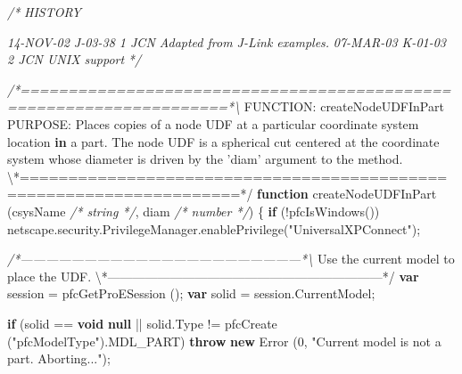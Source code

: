 \documentclass[]{article}
\newenvironment{Shaded}{}{}
\newcommand{\KeywordTok}[1]{\textcolor[rgb]{0.00,0.44,0.13}{\textbf{{#1}}}}
\newcommand{\DecValTok}[1]{\textcolor[rgb]{0.25,0.63,0.44}{{#1}}}
\newcommand{\StringTok}[1]{\textcolor[rgb]{0.25,0.44,0.63}{{#1}}}
\newcommand{\CommentTok}[1]{\textcolor[rgb]{0.38,0.63,0.69}{\textit{{#1}}}}
\newcommand{\OtherTok}[1]{\textcolor[rgb]{0.00,0.44,0.13}{{#1}}}
\newcommand{\FunctionTok}[1]{\textcolor[rgb]{0.02,0.16,0.49}{{#1}}}
\newcommand{\NormalTok}[1]{{#1}}
\begin{document}
\begin{Shaded}
\begin{Highlighting}[]
\CommentTok{/*}
\CommentTok{   HISTORY}

\CommentTok{14-NOV-02   J-03-38   $$1   JCN      Adapted from J-Link examples.}
\CommentTok{07-MAR-03   K-01-03   $$2   JCN      UNIX support}
\CommentTok{ */}

\CommentTok{/*====================================================================*\textbackslash{}}
\NormalTok{FUNCTION: createNodeUDFInPart}
\NormalTok{PURPOSE:  Places copies of a node UDF at a particular coordinate system }
          \NormalTok{location }\KeywordTok{in} \NormalTok{a }\OtherTok{part}\NormalTok{.  }\FunctionTok{The} \FunctionTok{node} \FunctionTok{UDF} \FunctionTok{is} \FunctionTok{a} \FunctionTok{spherical} \FunctionTok{cut} \FunctionTok{centered} \FunctionTok{at} \FunctionTok{the} 
          \NormalTok{coordinate system whose diameter is driven by the }\StringTok{'diam'} \NormalTok{argument to the }
          \OtherTok{method}\NormalTok{.}
\NormalTok{\textbackslash{}*====================================================================*}\OtherTok{/}
\KeywordTok{function} \FunctionTok{createNodeUDFInPart} \NormalTok{(csysName }\CommentTok{/* string */}\NormalTok{, }
                  \NormalTok{diam }\CommentTok{/* number */}\NormalTok{) }
\NormalTok{\{}
  \KeywordTok{if} \NormalTok{(!}\FunctionTok{pfcIsWindows}\NormalTok{())}
    \OtherTok{netscape}\NormalTok{.}\OtherTok{security}\NormalTok{.}\OtherTok{PrivilegeManager}\NormalTok{.}\FunctionTok{enablePrivilege}\NormalTok{(}\StringTok{"UniversalXPConnect"}\NormalTok{);}
  
\CommentTok{/*------------------------------------------------------------------*\textbackslash{}}
  \NormalTok{Use the current model to place the }\OtherTok{UDF}\NormalTok{.}
\NormalTok{\textbackslash{}*------------------------------------------------------------------*}\OtherTok{/}
  \KeywordTok{var} \NormalTok{session = }\FunctionTok{pfcGetProESession} \NormalTok{();}
  \KeywordTok{var} \NormalTok{solid = }\OtherTok{session}\NormalTok{.}\FunctionTok{CurrentModel}\NormalTok{;}
  
  \KeywordTok{if} \NormalTok{(solid == }\KeywordTok{void} \KeywordTok{null} \NormalTok{|| }\OtherTok{solid}\NormalTok{.}\FunctionTok{Type} \NormalTok{!= }\FunctionTok{pfcCreate} \NormalTok{(}\StringTok{"pfcModelType"}\NormalTok{).}\FunctionTok{MDL_PART}\NormalTok{)}
    \KeywordTok{throw} \KeywordTok{new} \FunctionTok{Error} \NormalTok{(}\DecValTok{0}\NormalTok{, }\StringTok{"Current model is not a part.  Aborting..."}\NormalTok{);}
  

\end{Highlighting}
\end{Shaded}
\end{document}
